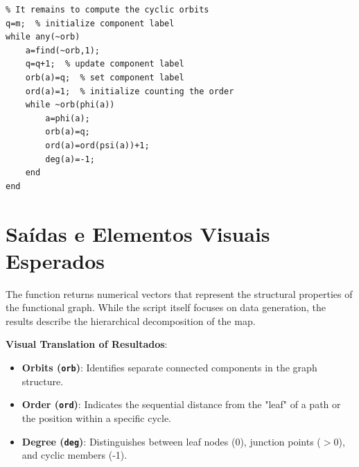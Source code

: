 \begin{lstlisting}
% It remains to compute the cyclic orbits
q=m;  % initialize component label
while any(~orb)
    a=find(~orb,1);
    q=q+1;  % update component label
    orb(a)=q;  % set component label
    ord(a)=1;  % initialize counting the order
    while ~orb(phi(a))
        a=phi(a);
        orb(a)=q;
        ord(a)=ord(psi(a))+1;
        deg(a)=-1;
    end
end
\end{lstlisting}

\section{Saídas e Elementos Visuais Esperados}

The function returns numerical vectors that represent the structural properties of the functional graph. While the script itself focuses on data generation, the results describe the hierarchical decomposition of the map.



\textbf{Visual Translation of Resultados}:
\begin{itemize}
    \item \textbf{Orbits (\texttt{orb})}: Identifies separate connected components in the graph structure.
    \item \textbf{Order (\texttt{ord})}: Indicates the sequential distance from the "leaf" of a path or the position within a specific cycle.
    \item \textbf{Degree (\texttt{deg})}: Distinguishes between leaf nodes (0), junction points ($>0$), and cyclic members (-1).
\end{itemize}

